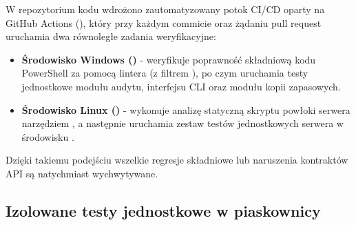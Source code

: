 W repozytorium kodu wdrożono zautomatyzowany potok CI/CD oparty na GitHub Actions (), który przy każdym commicie oraz żądaniu pull request uruchamia dwa równoległe zadania weryfikacyjne:
\begin{itemize}
    \item \textbf{Środowisko Windows ()} - weryfikuje poprawność składniową kodu PowerShell za pomocą lintera  (z filtrem ), po czym uruchamia testy jednostkowe modułu audytu, interfejsu CLI oraz modułu kopii zapasowych.
    \item \textbf{Środowisko Linux ()} - wykonuje analizę statyczną skryptu powłoki serwera  narzędziem , a następnie uruchamia zestaw testów jednostkowych serwera w środowisku .
\end{itemize}

Dzięki takiemu podejściu wszelkie regresje składniowe lub naruszenia kontraktów API są natychmiast wychwytywane.

\subsection{Izolowane testy jednostkowe w piaskownicy}\label{subsec:testy-jednostkowe}

